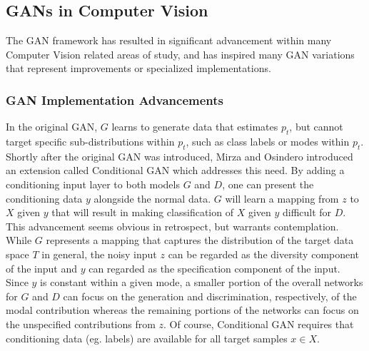\documentclass[11pt]{article}
\begin{document}
\subsection{GANs in Computer Vision}

The GAN framework has resulted in significant advancement within many Computer Vision related areas of study, and has inspired many GAN variations that represent improvements or specialized implementations.

\subsubsection{GAN Implementation Advancements}

In the original GAN, $G$ learns to generate data that estimates $p_t$, but cannot target specific sub-distributions within $p_t$, such as class labels or modes within $p_t$.  Shortly after the original GAN was introduced, Mirza and Osindero introduced an extension called Conditional GAN \cite{mirza2014conditional} which addresses this need.  By adding a conditioning input layer to both models $G$ and $D$, one can present the conditioning data $y$ alongside the normal data.  $G$ will learn a mapping from $z$ to $X$ given $y$ that will result in making classification of $X$ given $y$ difficult for $D$.  This advancement seems obvious in retrospect, but warrants contemplation.  While $G$ represents a mapping that captures the distribution of the target data space $T$ in general, the noisy input $z$ can be regarded as the diversity component of the input and $y$ can regarded as the specification component of the input.  Since $y$ is constant within a given mode, a smaller portion of the overall networks for $G$ and $D$ can focus on the generation and discrimination, respectively, of the modal contribution whereas the remaining portions of the networks can focus on the unspecified contributions from $z$.  Of course, Conditional GAN requires that conditioning data (eg. labels) are available for all target samples $x \in X$.
\end{document}
